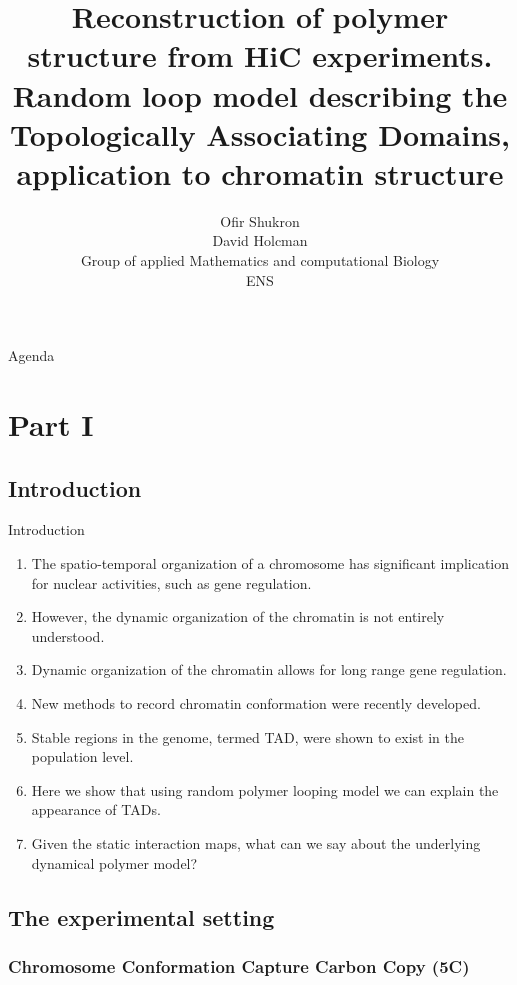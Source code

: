 \documentclass[8pt]{beamer}
\title{Reconstruction of polymer structure from HiC experiments. Random loop model describing the Topologically Associating Domains, application to chromatin structure}
\author{Ofir Shukron\\
David Holcman\\
Group of applied Mathematics and computational Biology\\
ENS}
\begin{document}
\begin{frame} %
\titlepage
\end{frame}

\begin{frame}{Agenda}
\tableofcontents
\end{frame}
\section{ Part I}

\subsection{Introduction}\label{subsection_introduction}

\begin{frame}{Introduction}
\begin{enumerate}
\item The spatio-temporal organization of a chromosome has significant implication for nuclear activities, such as gene regulation. 
\item However, the dynamic organization of the chromatin is not entirely understood.
\item Dynamic organization of the chromatin allows for long range gene regulation.
\item New methods to record chromatin conformation were recently developed. 
\item Stable regions in the genome, termed TAD, were shown to exist in the population level. 
\item Here we show that using random polymer looping model we can explain the appearance of TADs.
\item Given the static interaction maps, what can we say about the underlying dynamical polymer model?
\end{enumerate}
\end{frame}

\subsection{The experimental setting}\label{subsection_theExperimentalSetting}

\subsubsection{Chromosome Conformation Capture Carbon Copy (5C)}\label{subsubsection_chromosomeConformationCaptureExperiments}
\end{document}

